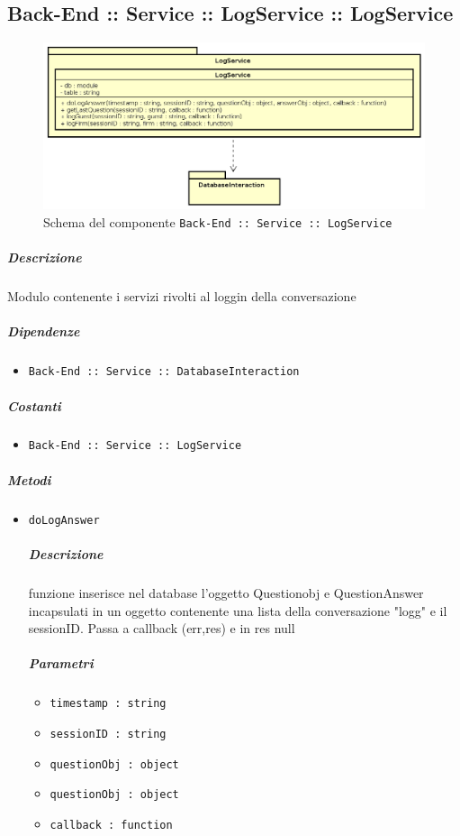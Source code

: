 \documentclass[../ManualeSviluppatore_v1.0.0.tex]{subfiles}
\begin{document}
\subsection{Back-End :: Service :: LogService :: LogService}
\begin{figure}[!h]
	\centering
	\includegraphics[scale=0.6]{Architettura/Back-End/Service/LogService.png}
	\caption{Schema del componente \texttt{Back-End :: Service :: LogService}}
\end{figure}
\subparagraph{Descrizione} Modulo contenente i servizi rivolti al loggin della conversazione
\subparagraph{Dipendenze}
\begin{itemize}
	\item \texttt{Back-End :: Service :: DatabaseInteraction}
\end{itemize}
\subparagraph{Costanti}
\begin{itemize}
	\item \texttt{Back-End :: Service :: LogService}
\end{itemize}
\subparagraph{Metodi}\begin{itemize}
\item \texttt{doLogAnswer}
\subparagraph{Descrizione}funzione inserisce nel database l'oggetto Questionobj e QuestionAnswer incapsulati in un oggetto contenente una lista della conversazione "logg" e il sessionID. Passa a callback (err,res) e in res null
\subparagraph{Parametri}
\begin{itemize}
	\item \texttt{timestamp : string}
	\item \texttt{sessionID : string}
	\item \texttt{questionObj : object}
	\item \texttt{questionObj : object}
	\item \texttt{callback : function}
\end{itemize}
\end{itemize}
\end{document}
